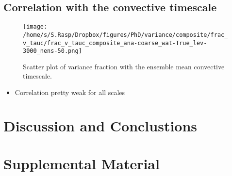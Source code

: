 \documentclass[a4paper, 12pt]{article}
\begin{document}

\newpage
\subsection{Correlation with the convective timescale}
\begin{figure}[h!]
\noindent \centering
\texttt{[image: /home/s/S.Rasp/Dropbox/figures/PhD/variance/composite/frac\_v\_tauc/frac\_v\_tauc\_composite\_ana-coarse\_wat-True\_lev-3000\_nens-50.png]}\\
\caption{Scatter plot of variance fraction with the ensemble mean convective timescale.} \label{fig:frac_v_tauc}
\end{figure}
\begin{itemize}
 \item Correlation pretty weak for all scales
\end{itemize}
\newpage



\section{Discussion and Conclustions}


\section{Supplemental Material}

\newpage

{\small
 }
 
\end{document}
